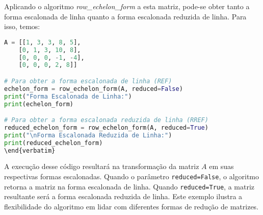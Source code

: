 Aplicando o algoritmo \textit{row\_echelon\_form} a esta matriz, pode-se obter tanto a forma escalonada de linha quanto a forma escalonada reduzida de linha. Para isso, temos:

\vspace{8pt}
\begin{lstlisting}[language=Python, caption={Exemplo de uso do algoritmo.}]
A = [[1, 3, 3, 8, 5],
    [0, 1, 3, 10, 8],
    [0, 0, 0, -1, -4],
    [0, 0, 0, 2, 8]]

# Para obter a forma escalonada de linha (REF)
echelon_form = row_echelon_form(A, reduced=False)
print("Forma Escalonada de Linha:")
print(echelon_form)

# Para obter a forma escalonada reduzida de linha (RREF)
reduced_echelon_form = row_echelon_form(A, reduced=True)
print("\nForma Escalonada Reduzida de Linha:")
print(reduced_echelon_form)
\end{verbatim}
\end{lstlisting}

A execução desse código resultará na transformação da matriz \( A \) em suas respectivas formas escalonadas. Quando o parâmetro \texttt{reduced=False}, o algoritmo retorna a matriz na forma escalonada de linha. Quando \texttt{reduced=True}, a matriz resultante será a forma escalonada reduzida de linha. Este exemplo ilustra a flexibilidade do algoritmo em lidar com diferentes formas de redução de matrizes.
